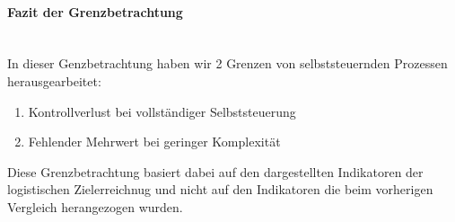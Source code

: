 \clearpage
\paragraph{Fazit der Grenzbetrachtung}\mbox{}\\

In dieser Genzbetrachtung haben wir 2 Grenzen von selbststeuernden Prozessen
herausgearbeitet:

\begin{enumerate}
  \item Kontrollverlust bei vollständiger Selbststeuerung
  \item Fehlender Mehrwert bei geringer Komplexität
\end{enumerate}

Diese Grenzbetrachtung basiert dabei auf den dargestellten Indikatoren der logistischen
Zielerreichnug und nicht auf den Indikatoren die beim vorherigen Vergleich herangezogen wurden.




% 
% 
% 